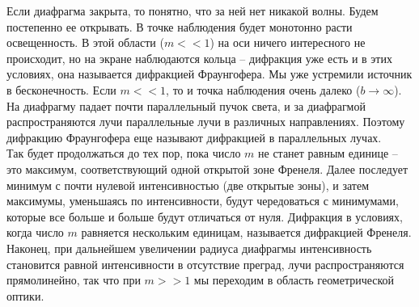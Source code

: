 \documentclass[__main__.tex]{subfiles}
\begin{document}
Если диафрагма закрыта, то понятно, что за ней нет никакой волны. Будем постепенно ее открывать. В точке наблюдения будет монотонно расти освещенность. В этой области ($m << 1$) на оси ничего интересного не происходит, но на экране наблюдаются кольца – дифракция уже есть и в этих условиях, она называется дифракцией Фраунгофера.
Мы уже устремили источник в бесконечность. Если $m << 1$,
то и точка наблюдения очень далеко ($b \rightarrow \infty$). На диафрагму падает почти параллельный пучок света, и за диафрагмой распространяются лучи параллельные лучи в различных направлениях. Поэтому дифракцию Фраунгофера еще называют дифракцией в параллельных лучах.\\
Так будет продолжаться до тех пор, пока число $m$ не станет равным единице – это максимум, соответствующий одной открытой зоне Френеля. Далее последует минимум с почти нулевой интенсивностью (две открытые зоны), и затем максимумы, уменьшаясь по интенсивности, будут чередоваться с минимумами, которые все больше и больше будут отличаться от нуля. Дифракция в условиях, когда число $m$ равняется нескольким единицам, называется дифракцией Френеля.
Наконец, при дальнейшем увеличении радиуса диафрагмы интенсивность становится равной интенсивности в отсутствие преград, лучи распространяются прямолинейно, так что при $m >> 1$ мы переходим в область геометрической
оптики.\\
\end{document}
